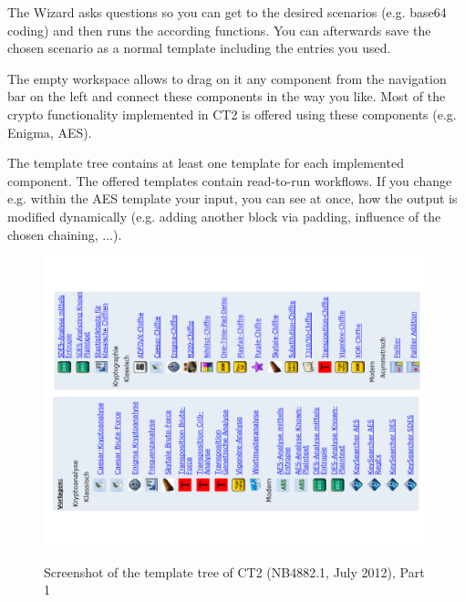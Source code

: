 The Wizard asks questions so you can get to the desired scenarios (e.g. base64 coding) and then runs the according functions. You can afterwards save the chosen scenario as a normal template including the entries you used.

The empty workspace allows to drag on it any component from the navigation bar on the left and connect these components in the way you like. Most of the crypto functionality implemented in CT2 is offered using these components (e.g. Enigma, AES). 

The template tree contains at least one template for each implemented component. The offered templates contain read-to-run workflows. If you change e.g. within the AES template your input, you can see at once, how the output is modified dynamically (e.g. adding another block via padding, influence of the chosen chaining, ...).

\clearpage
\begin{figure}[hb]
\begin{center}
\vspace{-30pt}
\includegraphics[scale=0.8, angle=270]
                {figures/CT2-templatetree-en-1}
\hypertarget{appendix-figure-template-overview-CT2}{}
\caption{Screenshot of the template tree of CT2 (NB4882.1, July 2012), Part 1} 
\label{appendix-figure-template-overview-CT2}
\end{center}
\end{figure}
\clearpage





\newpage
\hypertarget{appendix-function-overview-JCT}{}

